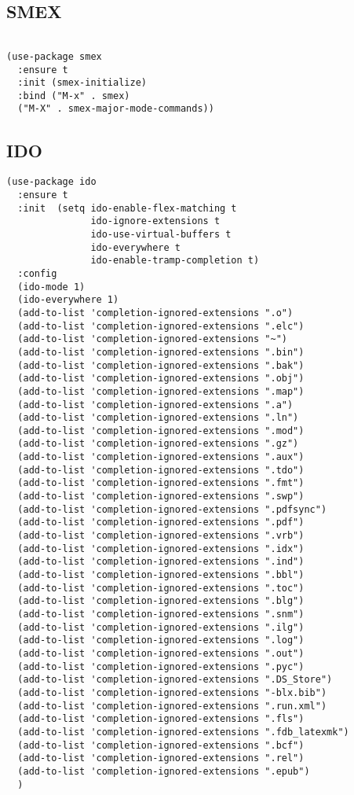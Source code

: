 \documentclass[12pt]{article}
\begin{document}
\subsection{SMEX}
\label{sec:org42ef061}

\lstset{language=Lisp,label= ,caption= ,captionpos=b,numbers=none}
\begin{lstlisting}

(use-package smex
  :ensure t
  :init (smex-initialize)
  :bind ("M-x" . smex)
  ("M-X" . smex-major-mode-commands))
\end{lstlisting}

\subsection{IDO}
\label{sec:org55e925a}

\lstset{language=Lisp,label= ,caption= ,captionpos=b,numbers=none}
\begin{lstlisting}
(use-package ido
  :ensure t
  :init  (setq ido-enable-flex-matching t
               ido-ignore-extensions t
               ido-use-virtual-buffers t
               ido-everywhere t
               ido-enable-tramp-completion t)
  :config
  (ido-mode 1)
  (ido-everywhere 1)
  (add-to-list 'completion-ignored-extensions ".o")
  (add-to-list 'completion-ignored-extensions ".elc")
  (add-to-list 'completion-ignored-extensions "~")
  (add-to-list 'completion-ignored-extensions ".bin")
  (add-to-list 'completion-ignored-extensions ".bak")
  (add-to-list 'completion-ignored-extensions ".obj")
  (add-to-list 'completion-ignored-extensions ".map")
  (add-to-list 'completion-ignored-extensions ".a")
  (add-to-list 'completion-ignored-extensions ".ln")
  (add-to-list 'completion-ignored-extensions ".mod")
  (add-to-list 'completion-ignored-extensions ".gz")
  (add-to-list 'completion-ignored-extensions ".aux")
  (add-to-list 'completion-ignored-extensions ".tdo")
  (add-to-list 'completion-ignored-extensions ".fmt")
  (add-to-list 'completion-ignored-extensions ".swp")
  (add-to-list 'completion-ignored-extensions ".pdfsync")
  (add-to-list 'completion-ignored-extensions ".pdf")
  (add-to-list 'completion-ignored-extensions ".vrb")
  (add-to-list 'completion-ignored-extensions ".idx")
  (add-to-list 'completion-ignored-extensions ".ind")
  (add-to-list 'completion-ignored-extensions ".bbl")
  (add-to-list 'completion-ignored-extensions ".toc")
  (add-to-list 'completion-ignored-extensions ".blg")
  (add-to-list 'completion-ignored-extensions ".snm")
  (add-to-list 'completion-ignored-extensions ".ilg")
  (add-to-list 'completion-ignored-extensions ".log")
  (add-to-list 'completion-ignored-extensions ".out")
  (add-to-list 'completion-ignored-extensions ".pyc")
  (add-to-list 'completion-ignored-extensions ".DS_Store")
  (add-to-list 'completion-ignored-extensions "-blx.bib")
  (add-to-list 'completion-ignored-extensions ".run.xml")
  (add-to-list 'completion-ignored-extensions ".fls")
  (add-to-list 'completion-ignored-extensions ".fdb_latexmk")
  (add-to-list 'completion-ignored-extensions ".bcf")
  (add-to-list 'completion-ignored-extensions ".rel")
  (add-to-list 'completion-ignored-extensions ".epub")
  )


\end{lstlisting}
\end{document}
